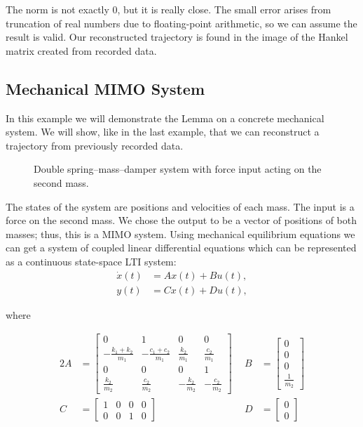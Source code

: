 \documentclass[12pt,a4paper]{report}
\begin{document}
\clearpage

The norm is not exactly 0, but it is really close. The small error arises from truncation of real numbers due to floating-point arithmetic, so we can assume the result is valid. Our reconstructed trajectory is found in the image
of the Hankel matrix created from recorded data.

\subsection{Mechanical MIMO System}
\label{sec:mimo}

In this example we will demonstrate the Lemma on a concrete mechanical system. We will show, like in the last example, that we can reconstruct a trajectory from previously recorded data.

\begin{figure}[ht]
    \centering
    
    \caption{Double spring--mass--damper system with force input acting on the second mass.}
    \label{fig:double-spring-mass-damper}
\end{figure}

The states of the system are positions and velocities of each mass. The input is a force on the second mass. We chose the output to be a vector of positions of both masses; thus, this is a MIMO system. Using mechanical equilibrium equations we can get a system of coupled linear differential equations
which can be represented as a continuous state-space LTI system:
\begin{align*}
    \dot{x}(t) &= Ax(t) + Bu(t), \\
    y(t) &= Cx(t) + Du(t),
\end{align*}

where

\begin{alignat}{2}
    \label{eq:dsmd-abcd}
    A &= \begin{bmatrix}
        0 & 1 & 0 & 0 \\ -\frac{k_1+k_2}{m_1} & -\frac{c_1+c_2}{m_1} & \frac{k_2}{m_1} & \frac{c_2}{m_1} \\
        0 & 0 & 0 & 1 \\ \frac{k_2}{m_2} & \frac{c_2}{m_2} & -\frac{k_2}{m_2} & -\frac{c_2}{m_2}
    \end{bmatrix} \ \ & B &= \begin{bmatrix}0 \\ 0 \\ 0 \\ \frac{1}{m_2}\end{bmatrix} \\
    C &= \begin{bmatrix} 1 & 0 & 0 & 0 \\ 0 & 0 & 1 & 0\end{bmatrix}  & D &= \begin{bmatrix} 0 \\ 0 \end{bmatrix}
\end{alignat}
\end{document}
